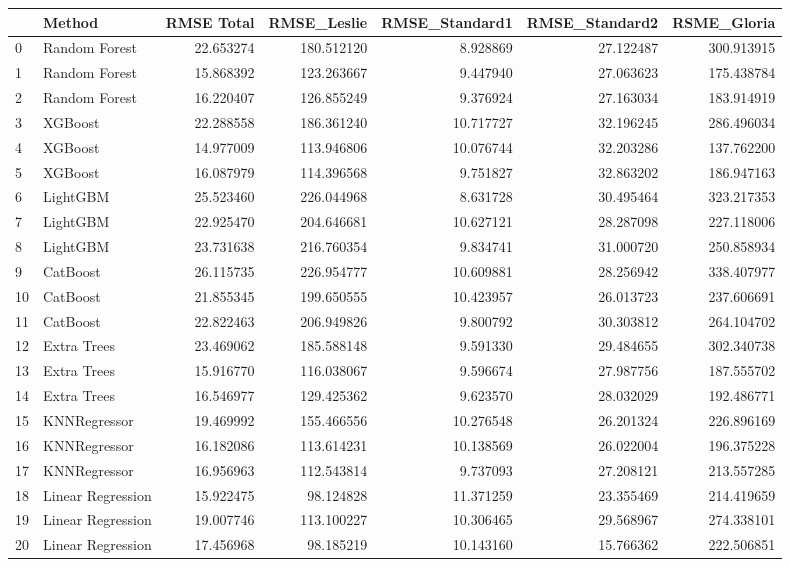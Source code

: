 \begin{tabular}{llrrrrr}
\toprule
{} &             Method &  RMSE Total &  RMSE\_Leslie &  RMSE\_Standard1 &  RMSE\_Standard2 &  RSME\_Gloria \\
\midrule
0  &      Random Forest &   22.653274 &   180.512120 &        8.928869 &       27.122487 &   300.913915 \\
1  &      Random Forest &   15.868392 &   123.263667 &        9.447940 &       27.063623 &   175.438784 \\
2  &      Random Forest &   16.220407 &   126.855249 &        9.376924 &       27.163034 &   183.914919 \\
3  &            XGBoost &   22.288558 &   186.361240 &       10.717727 &       32.196245 &   286.496034 \\
4  &            XGBoost &   14.977009 &   113.946806 &       10.076744 &       32.203286 &   137.762200 \\
5  &            XGBoost &   16.087979 &   114.396568 &        9.751827 &       32.863202 &   186.947163 \\
6  &           LightGBM &   25.523460 &   226.044968 &        8.631728 &       30.495464 &   323.217353 \\
7  &           LightGBM &   22.925470 &   204.646681 &       10.627121 &       28.287098 &   227.118006 \\
8  &           LightGBM &   23.731638 &   216.760354 &        9.834741 &       31.000720 &   250.858934 \\
9  &           CatBoost &   26.115735 &   226.954777 &       10.609881 &       28.256942 &   338.407977 \\
10 &           CatBoost &   21.855345 &   199.650555 &       10.423957 &       26.013723 &   237.606691 \\
11 &           CatBoost &   22.822463 &   206.949826 &        9.800792 &       30.303812 &   264.104702 \\
12 &        Extra Trees &   23.469062 &   185.588148 &        9.591330 &       29.484655 &   302.340738 \\
13 &        Extra Trees &   15.916770 &   116.038067 &        9.596674 &       27.987756 &   187.555702 \\
14 &        Extra Trees &   16.546977 &   129.425362 &        9.623570 &       28.032029 &   192.486771 \\
15 &       KNNRegressor &   19.469992 &   155.466556 &       10.276548 &       26.201324 &   226.896169 \\
16 &       KNNRegressor &   16.182086 &   113.614231 &       10.138569 &       26.022004 &   196.375228 \\
17 &       KNNRegressor &   16.956963 &   112.543814 &        9.737093 &       27.208121 &   213.557285 \\
18 &  Linear Regression &   15.922475 &    98.124828 &       11.371259 &       23.355469 &   214.419659 \\
19 &  Linear Regression &   19.007746 &   113.100227 &       10.306465 &       29.568967 &   274.338101 \\
20 &  Linear Regression &   17.456968 &    98.185219 &       10.143160 &       15.766362 &   222.506851 \\
\bottomrule
\end{tabular}
